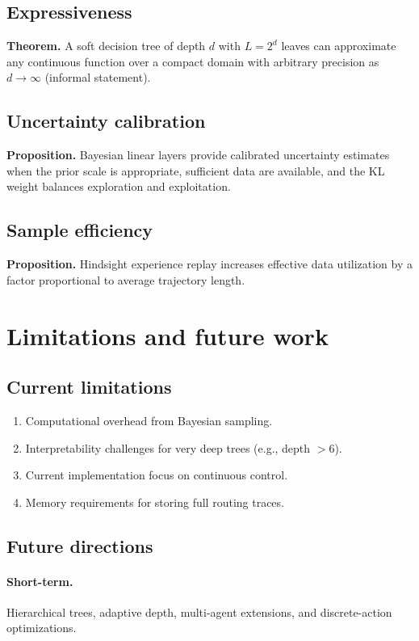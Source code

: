 \documentclass[11pt]{article}
\begin{document}
\subsection{Expressiveness}
\textbf{Theorem.} A soft decision tree of depth $d$ with $L=2^d$ leaves can approximate any continuous function over a compact domain with arbitrary precision as $d\to\infty$ (informal statement).

\subsection{Uncertainty calibration}
\textbf{Proposition.} Bayesian linear layers provide calibrated uncertainty estimates when the prior scale is appropriate, sufficient data are available, and the KL weight balances exploration and exploitation.

\subsection{Sample efficiency}
\textbf{Proposition.} Hindsight experience replay increases effective data utilization by a factor proportional to average trajectory length.

\section{Limitations and future work}
\subsection{Current limitations}
\begin{enumerate}
\item Computational overhead from Bayesian sampling.
\item Interpretability challenges for very deep trees (e.g., depth $>6$).
\item Current implementation focus on continuous control.
\item Memory requirements for storing full routing traces.
\end{enumerate}

\subsection{Future directions}
\paragraph{Short-term.} Hierarchical trees, adaptive depth, multi-agent extensions, and discrete-action optimizations.
\end{document}
